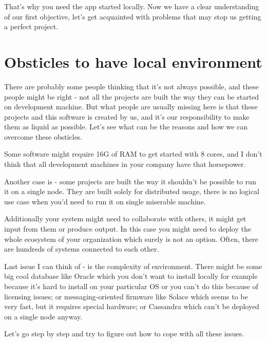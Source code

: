 \documentclass[11pt,a4paper,oneside]{article}
\begin{document}
That's why you need the app started locally. Now we have a clear understanding of our first objective, let's get acquainted with problems that may stop us getting a perfect project.

\section{Obsticles to have local environment}

There are probably some people thinking that it's not always possible, and these people might be right - not all the projects are built the way they can be started on development machine. But what people are usually missing here is that these projects and this software is created by us, and it's our responsibility to make them as liquid as possible. Let's see what can be the reasons and how we can overcome these obsticles.

Some software might require 16G of RAM to get started with 8 cores, and I don't think that all development machines in your company have that horsepower. 

Another case is - some projects are built the way it shouldn't be possible to run it on a single node. They are built solely for distributed usage, there is no logical use case when you'd need to run it on single miserable machine.

Additionally your system might need to collaborate with others, it might get input from them or produce output. In this case you might need to deploy the whole ecosystem of your organization which surely is not an option. Often, there are hundreds of systems connected to each other.

Last issue I can think of - is the complexity of environment. There might be some big cool database like Oracle which you don't want to install locally for example because it's hard to install on your particular OS or you can't do this because of licensing issues; or messaging-oriented firmware like Solace which seems to be very fast, but it requires special hardware; or Cassandra which can't be deployed on a single node anyway. 

Let's go step by step and try to figure out how to cope with all these issues.
\end{document}
